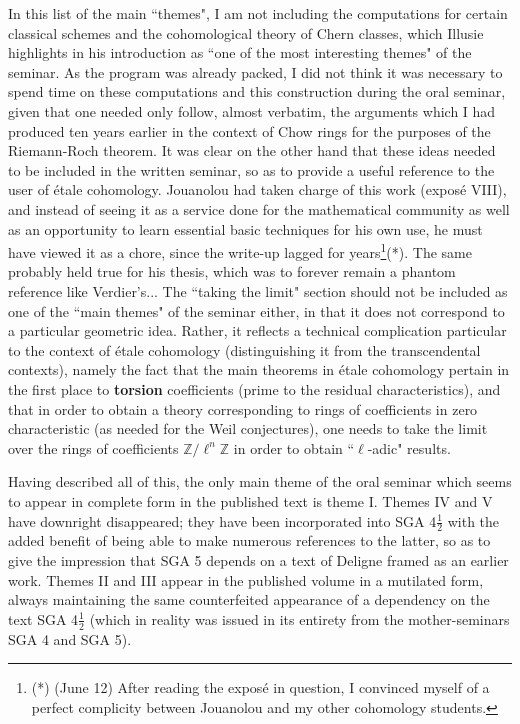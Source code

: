 In this list of the main ``themes", I am not including the computations for certain classical schemes and the cohomological theory of Chern classes, which Illusie highlights in his introduction as ``one of the most interesting themes" of the seminar. As the program was already packed, I did not think it was necessary to spend time on these computations and this construction during the oral seminar, given that one needed only follow, almost verbatim, the arguments which I had produced ten years earlier in the context of Chow rings for the purposes of the Riemann-Roch theorem. It was clear on the other hand that these ideas needed to be included in the written seminar, so as to provide a useful reference to the user of \'etale cohomology.  Jouanolou had taken charge of this work (expos\'e VIII), and instead of seeing it as a service done for the mathematical community as well as an opportunity to learn essential basic techniques for his own use, he must have viewed it as a chore, since the write-up lagged for years\footnote{(*) (June 12) After reading the expos\'e in question, I convinced myself of a perfect complicity between Jouanolou and my other cohomology students.}(*). The same probably held true for his thesis, which was to forever remain a phantom reference like Verdier's... The ``taking the limit" section should not be included as one of the ``main themes" of the seminar either, in that it does not correspond to a particular geometric idea. Rather, it reflects a technical complication particular to the context of \'etale cohomology (distinguishing it from the transcendental contexts), namely the fact that the main theorems in \'etale cohomology pertain in the first place to \textbf{torsion} coefficients (prime to the residual characteristics), and that in order to obtain a theory corresponding to rings of coefficients in zero characteristic (as needed for the Weil conjectures), one needs to take the limit over the rings of coefficients $\mathbb{Z}/{\ell^n\mathbb{Z}}$ in order to obtain ``$\ell$-adic" results.

Having described all of this, the only main theme of the oral seminar which seems to appear in complete form in the published text is theme I. Themes IV and V have downright disappeared; they have been incorporated into SGA 4$\frac{1}{2}$ with the added benefit of being able to make numerous references to the latter, so as to give the impression that SGA 5 depends on a text of Deligne framed as an earlier work. Themes II and III appear in the published volume in a mutilated form, always maintaining the same counterfeited appearance of a dependency on the text SGA 4$\frac{1}{2}$ (which in reality was issued in its entirety from the mother-seminars SGA 4 and SGA 5).

